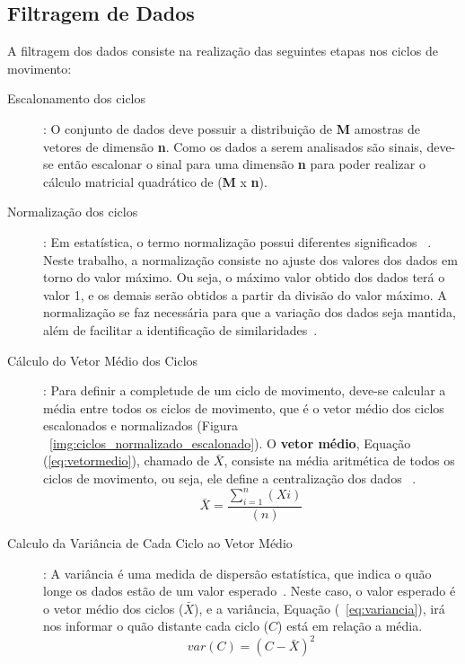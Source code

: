 \subsection{Filtragem de Dados}\label{section:filtro_dados}

A filtragem dos dados consiste na realização das seguintes etapas nos ciclos de movimento:
\begin{description}
	\item [Escalonamento dos ciclos]: O conjunto de dados deve possuir a distribuição de \textbf{M} amostras de vetores de dimensão \textbf{n}. Como os dados a serem analisados são sinais, deve-se então escalonar o sinal para uma dimensão \textbf{n} para poder realizar o cálculo matricial quadrático de (\textbf{M} x \textbf{n}).		
	\item [Normalização dos ciclos]: Em estatística, o termo normalização possui diferentes significados ~\cite{statisticterms2006}. Neste trabalho, a normalização consiste no ajuste dos valores dos dados em torno do valor máximo. Ou seja, o máximo valor obtido dos dados terá o valor 1, e os demais serão obtidos a partir da divisão do valor máximo. A normalização se faz necessária para que a variação dos dados seja mantida, além de facilitar a identificação de similaridades~\cite{vicini2005}. 	
	\item [Cálculo do Vetor Médio dos Ciclos]: Para definir a completude de um ciclo de movimento, deve-se calcular a média entre todos os ciclos de movimento, que é o vetor médio dos ciclos escalonados e normalizados (Figura ~\ref{img:ciclos_normalizado_escalonado}). O \textbf{vetor médio}, Equação (\ref{eq:vetormedio}), chamado de $\bar{X}$, consiste na média aritmética de todos os ciclos de movimento, ou seja, ele define a centralização dos dados ~\cite{statisticshandbook2009}. 	
		\begin{equation}
			\bar{X}=\frac{\sum_{i=1}^{n}(Xi)}{(n)}
			\label{eq:vetormedio}
		\end{equation}
	\item [Calculo da Variância de Cada Ciclo ao Vetor Médio]: A variância é uma medida de dispersão estatística, que indica o quão longe os dados estão de um valor esperado~\cite{statisticshandbook2009}. Neste caso, o valor esperado é o vetor médio dos ciclos ($\bar{X}$), e a variância, Equação (~\ref{eq:variancia}), irá nos informar o quão distante cada ciclo ($C$) está em relação a média.
		\begin{equation}
			var(C) = (C - \bar{X} )^2
			\label{eq:variancia}
		\end{equation}
		

\end{description}
